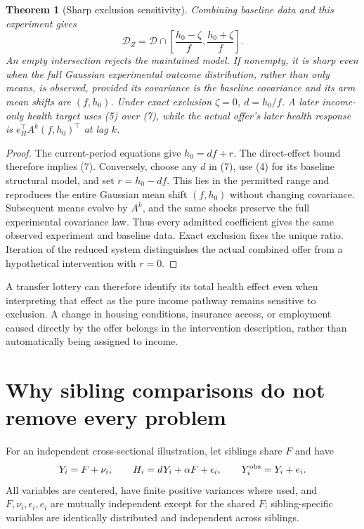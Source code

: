 \documentclass[11pt,a4paper]{article}
\newtheorem{theorem}{Theorem}[section]
\theoremstyle{remark}
\begin{document}
\begin{theorem}[Sharp exclusion sensitivity]
Combining baseline data and this experiment gives
\[
 \mathcal D_Z=\mathcal D\cap
 \left[\frac{h_0-\zeta}{f},\frac{h_0+\zeta}{f}\right]. \tag{7}
\]
An empty intersection rejects the maintained model. If nonempty, it is sharp even when the full Gaussian experimental outcome distribution, rather than only means, is observed, provided its covariance is the baseline covariance and its arm mean shifts are $(f,h_0)$. Under exact exclusion $\zeta=0$, $d=h_0/f$. A later income-only health target uses (5) over (7), while the actual offer's later health response is $e_H^\top A^k(f,h_0)^\top$ at lag $k$.
\end{theorem}
\begin{proof}
The current-period equations give $h_0=df+r$. The direct-effect bound therefore implies (7). Conversely, choose any $d$ in (7), use (4) for its baseline structural model, and set $r=h_0-df$. This lies in the permitted range and reproduces the entire Gaussian mean shift $(f,h_0)$ without changing covariance. Subsequent means evolve by $A^k$, and the same shocks preserve the full experimental covariance law. Thus every admitted coefficient gives the same observed experiment and baseline data. Exact exclusion fixes the unique ratio. Iteration of the reduced system distinguishes the actual combined offer from a hypothetical intervention with $r=0$.
\end{proof}
A transfer lottery can therefore identify its total health effect even when interpreting that effect as the pure income pathway remains sensitive to exclusion. A change in housing conditions, insurance access, or employment caused directly by the offer belongs in the intervention description, rather than automatically being assigned to income.

\section{Why sibling comparisons do not remove every problem}
For an independent cross-sectional illustration, let siblings share $F$ and have
\[
 Y_i=F+\nu_i,\qquad H_i=dY_i+\alpha F+\epsilon_i,
 \qquad Y_i^{\rm obs}=Y_i+e_i.
\]
All variables are centered, have finite positive variances where used, and $F,\nu_i,\epsilon_i,e_i$ are mutually independent except for the shared $F$; sibling-specific variables are identically distributed and independent across siblings.
\end{document}
